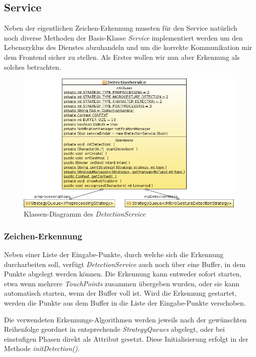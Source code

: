 \subsection{Service}\label{lbl_be_impl_service}

Neben der eigentlichen Zeichen-Erkennung mussten für den Service natürlich noch diverse Methoden der Basis-Klasse \emph{Service} implementiert werden um den Lebenszyklus des Dienstes abzuhandeln und um die korrekte Kommunikation mir dem Frontend sicher zu stellen. Als Erstes wollen wir nun aber Erkennung als solches betrachten.

\begin{figure}[h!]
   \centering
   \includegraphics[width=\textwidth]{img/uml_cd_detectionservice} 
   \caption{Klassen-Diagramm des \emph{DetectionService}}
   \label{fig:cd_detectionservice}
\end{figure}

\subsubsection{Zeichen-Erkennung}

Neben einer Liste der Eingabe-Punkte, durch welche sich die Erkennung durcharbeiten soll, verfügt \emph{DetectionService} auch noch über eine Buffer, in dem Punkte abgelegt werden können. Die Erkennung kann entweder sofort starten, etwa wenn mehrere \emph{TouchPoints} zusammen übergeben wurden, oder sie kann automatisch starten, wenn der Buffer voll ist. Wird die Erkennung gestartet, werden die Punkte aus dem Buffer in die Liste der Eingabe-Punkte verschoben.

Die verwendeten Erkennungs-Algorithmen werden jeweils nach der gewünschten Reihenfolge geordnet in entsprechende \emph{StrategyQueues} abgelegt, oder bei einstufigen Phasen direkt als Attribut gesetzt. Diese Initialisierung erfolgt in der Methode \emph{initDetection()}.

